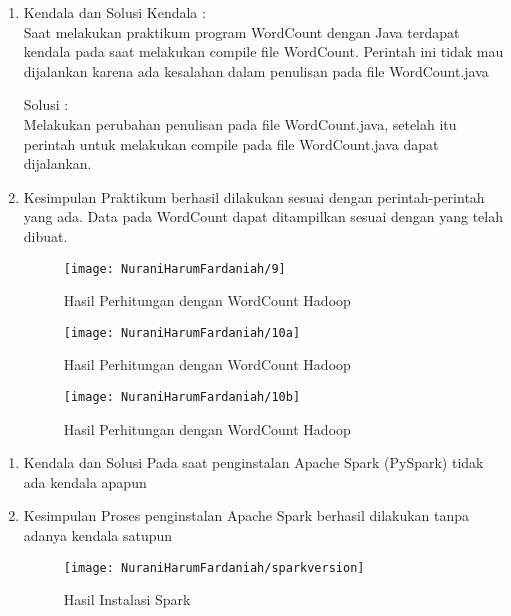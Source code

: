 \begin{enumerate}
\item Kendala dan Solusi
\newline Kendala :\\
Saat melakukan praktikum program WordCount dengan Java terdapat kendala pada saat melakukan compile file WordCount. Perintah ini tidak mau dijalankan karena ada kesalahan dalam penulisan pada file WordCount.java

Solusi :\\
Melakukan perubahan penulisan pada file WordCount.java, setelah itu perintah untuk melakukan compile pada file WordCount.java dapat dijalankan.

\item Kesimpulan
\newline Praktikum berhasil dilakukan sesuai dengan perintah-perintah yang ada. Data pada WordCount dapat ditampilkan sesuai dengan yang telah dibuat.


\begin{figure}[!ht]
\texttt{[image: NuraniHarumFardaniah/9]}
\caption{Hasil Perhitungan dengan WordCount Hadoop}
\label{gam:perkuliahan-25-11}
\end{figure}

\begin{figure}[!ht]
\texttt{[image: NuraniHarumFardaniah/10a]}
\caption{Hasil Perhitungan dengan WordCount Hadoop}
\label{gam:perkuliahan-25-11}
\end{figure}
\newpage
\begin{figure}[!ht]
\texttt{[image: NuraniHarumFardaniah/10b]}
\caption{Hasil Perhitungan dengan WordCount Hadoop}
\label{gam:perkuliahan-25-11}
\end{figure}

\end{enumerate}

\begin{enumerate}
\item Kendala dan Solusi
\newline Pada saat penginstalan Apache Spark (PySpark) tidak ada kendala apapun

\item Kesimpulan
\newline Proses penginstalan Apache Spark berhasil dilakukan tanpa adanya kendala satupun
\newpage
\begin{figure}[!ht]
\texttt{[image: NuraniHarumFardaniah/sparkversion]}
\caption{Hasil Instalasi Spark}
\label{gam:perkuliahan-25-11}
\end{figure}

\end{enumerate}

